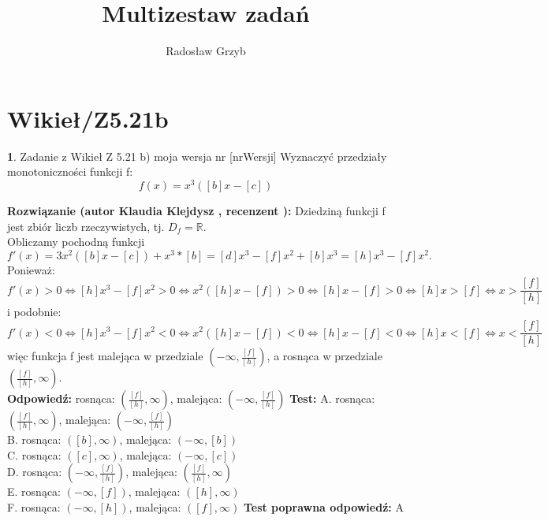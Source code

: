 \documentclass[12pt, a4paper]{article}
\title{Multizestaw zadań}
\author{Radosław Grzyb}
\date{}
\theoremstyle{definition} %
\newtheorem{zad}{}
\newcommand{\kategoria}[1]{\section{#1}} %
\newcommand{\zadStart}[1]{\begin{zad}#1\newline} %
\newcommand{\zadStop}{\end{zad}}   %
\newcommand{\rozwStart}[2]{\noindent \textbf{Rozwiązanie (autor #1 , recenzent #2): }\newline} %
\newcommand{\rozwStop}{\newline}                                            %
\newcommand{\odpStart}{\noindent \textbf{Odpowiedź:}\newline}    %
\newcommand{\odpStop}{\newline}                                             %
\newcommand{\testStart}{\noindent \textbf{Test:}\newline} %
\newcommand{\testStop}{\newline} %
\newcommand{\kluczStart}{\noindent \textbf{Test poprawna odpowiedź:}\newline} %
\newcommand{\kluczStop}{\newline} %
\begin{document}
\maketitle


\kategoria{Wikieł/Z5.21b}
\zadStart{Zadanie z Wikieł Z 5.21 b) moja wersja nr [nrWersji]}
Wyznaczyć przedziały monotoniczności funkcji f:
$$f(x)=x^3([b]x-[c])$$
\zadStop
\rozwStart{Klaudia Klejdysz}{}
Dziedziną funkcji f jest zbiór liczb rzeczywistych, tj. $D_f=\mathbb{R}$.\\
Obliczamy pochodną funkcji
$$f'(x)=3x^2([b]x-[c])+x^3*[b]=[d]x^3-[f]x^2+[b]x^3=[h]x^3-[f]x^2\text{.}$$
Ponieważ:
$$f'(x)>0 \Leftrightarrow [h]x^3-[f]x^2>0\Leftrightarrow x^2([h]x-[f])>0\Leftrightarrow[h]x-[f]>0\Leftrightarrow[h]x>[f]\Leftrightarrow x>\frac{[f]}{[h]}$$
i podobnie:
$$f'(x)<0 \Leftrightarrow [h]x^3-[f]x^2<0\Leftrightarrow x^2([h]x-[f])<0\Leftrightarrow[h]x-[f]<0\Leftrightarrow[h]x<[f]\Leftrightarrow x<\frac{[f]}{[h]}$$
więc funkcja f jest malejąca w przedziale $(-\infty,\frac{[f]}{[h]})$, a rosnąca w przedziale $(\frac{[f]}{[h]},\infty)$.
\\
\rozwStop
\odpStart
rosnąca: $(\frac{[f]}{[h]},\infty)$, malejąca: $(-\infty,\frac{[f]}{[h]})$
\odpStop
\testStart
A. rosnąca: $(\frac{[f]}{[h]},\infty)$, malejąca: $(-\infty,\frac{[f]}{[h]})$\\
B. rosnąca: $([b],\infty)$, malejąca: $(-\infty,[b])$\\
C. rosnąca: $([c],\infty)$, malejąca: $(-\infty,[c])$\\
D. rosnąca: $(-\infty,\frac{[f]}{[h]})$, malejąca: $(\frac{[f]}{[h]},\infty)$\\
E. rosnąca: $(-\infty,[f])$, malejąca: $([h],\infty)$\\
F. rosnąca: $(-\infty,[h])$, malejąca: $([f],\infty)$
\testStop
\kluczStart
A
\kluczStop
\end{document}
